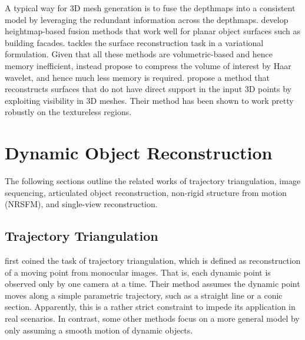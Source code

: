 A typical way for 3D mesh generation is to fuse the depthmaps into a consistent model by leveraging the redundant information across the depthmaps. \citet{gallup20103d,gallup2010heightmap} develop heightmap-based fusion methods that work well for planar object surfaces such as building facades. \citet{zach2008fast} tackles the surface reconstruction task in a variational formulation.
Given that all these methods are volumetric-based and hence memory inefficient, \citet{zheng2012efficient} instead propose to compress the volume of interest by Haar wavelet, and hence much less memory is required. \citet{JAN} propose a method that reconstructs surfaces that do not have direct support in the input 3D points by exploiting visibility in 3D meshes. Their method has been shown to work pretty robustly on the textureless regions.


\section{Dynamic Object Reconstruction}
The following sections outline the related works of trajectory triangulation, image sequencing, articulated object reconstruction,  non-rigid structure from motion (NRSFM), and single-view reconstruction.

\subsection{Trajectory Triangulation}
\citet{avidan2000trajectory} first coined the task of trajectory triangulation, which is defined as  reconstruction of a moving point from monocular images. That is, each dynamic point is observed only by one camera at a time. Their method assumes the dynamic point moves along a simple parametric trajectory, such as a straight line or a conic section. Apparently, this is a rather strict constraint to impede its application in real scenarios. 
In contrast, some other methods  \cite{Park_ECCV2010,Valmadre_CVPR2012,ZhuCL_CVPR11,park20153d} focus on a more general model by only assuming a smooth motion of dynamic objects.

